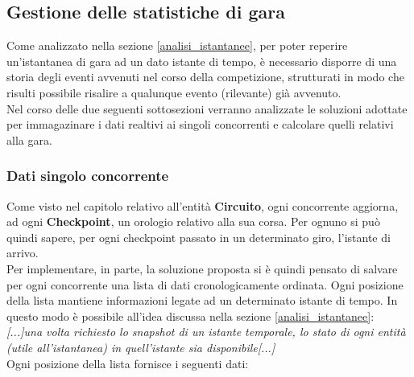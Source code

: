 \subsection{Gestione delle statistiche di gara}
\label{statistiche}
Come analizzato nella sezione \ref{analisi_istantanee}, per poter reperire
un'istantanea di gara ad un dato istante di tempo, è necessario
disporre di una storia degli eventi avvenuti nel corso della competizione,
strutturati in modo che risulti possibile risalire a qualunque evento
(rilevante) già avvenuto.\\ 
Nel corso delle due seguenti sottosezioni verranno analizzate le soluzioni
adottate per immagazinare i dati realtivi ai singoli concorrenti
e calcolare quelli relativi alla gara.
     \subsubsection{Dati singolo concorrente}
     Come visto nel capitolo relativo all'entità \textbf{Circuito}, ogni
concorrente aggiorna, ad ogni 
     \textbf{Checkpoint}, un orologio relativo alla sua corsa. Per ognuno si può
quindi sapere, per ogni checkpoint passato in un determinato giro,
     l'istante di arrivo.\\
     Per implementare, in parte, la soluzione proposta si è quindi pensato di
salvare per ogni concorrente una lista di dati cronologicamente ordinata.
     Ogni posizione della lista mantiene informazioni legate ad un determinato
istante di tempo. In questo modo è possibile all'idea discussa nella
     sezione \ref{analisi_istantanee}:\\
     \emph{[...]una volta richiesto lo snapshot di un istante temporale, lo
stato di ogni entità (utile all'istantanea) in 
     quell'istante sia disponibile[...]}\\
     Ogni posizione della lista fornisce i seguenti dati:
